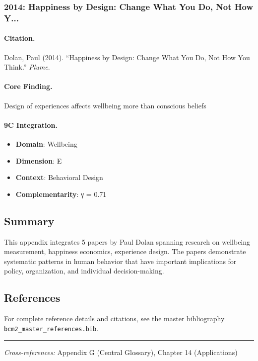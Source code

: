 \subsubsection{2014: Happiness by Design: Change What You Do, Not How Y...}

\paragraph{Citation.}
Dolan, Paul (2014). ``Happiness by Design: Change What You Do, Not How You Think.''
\textit{Plume}.

\paragraph{Core Finding.}
Design of experiences affects wellbeing more than conscious beliefs

\paragraph{9C Integration.}
\begin{itemize}[nosep]
  \item \textbf{Domain}: Wellbeing
  \item \textbf{Dimension}: E
  \item \textbf{Context}: Behavioral Design
  \item \textbf{Complementarity}: γ = 0.71
\end{itemize}

\subsection{Summary}

This appendix integrates 5 papers by Paul Dolan
spanning research on wellbeing measurement, happiness economics, experience design.
The papers demonstrate systematic patterns in human behavior that have important
implications for policy, organization, and individual decision-making.

\subsection{References}

For complete reference details and citations, see the master bibliography
\texttt{bcm2\_master\_references.bib}.

\vspace{1em}
\hrule
\vspace{0.5em}

\noindent\textit{Cross-references:}
Appendix G (Central Glossary), Chapter 14 (Applications)
